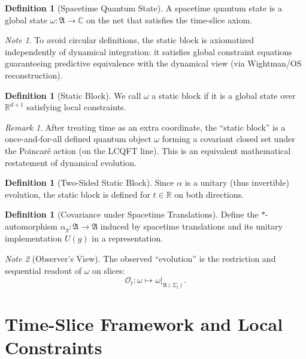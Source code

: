 \documentclass[11pt]{article}
\theoremstyle{definition}
\newtheorem{definition}[theorem]{Definition}
\theoremstyle{remark}
\newtheorem{remark}[theorem]{Remark}
\newtheorem*{note}{Note}
\begin{document}
\begin{definition}[Spacetime Quantum State]\label{def:spacetimestate}
A spacetime quantum state is a global state \( \omega: \mathfrak{A}\to\mathbb{C} \) on the net that satisfies the time-slice axiom.
\end{definition}

\begin{note}
To avoid circular definitions, the static block is axiomatized independently of dynamical integration: it satisfies global constraint equations guaranteeing predictive equivalence with the dynamical view (via Wightman/OS reconstruction).
\end{note}

\begin{definition}[Static Block]\label{def:staticblock}
We call \( \omega \) a static block if it is a global state over \( \mathbb{R}^{d+1} \) satisfying local constraints.
\end{definition}

\begin{remark}
After treating time as an extra coordinate, the ``static block'' is a once-and-for-all defined quantum object \( \omega \) forming a covariant closed set under the Poincaré action (on the LCQFT line). This is an equivalent mathematical restatement of dynamical evolution.
\end{remark}

\begin{definition}[Two-Sided Static Block]\label{def:twosided}
Since \( \alpha \) is a unitary (thus invertible) evolution, the static block is defined for \( t\in\mathbb{R} \) on both directions.
\end{definition}

\begin{definition}[Covariance under Spacetime Translations]\label{def:covariance}
Define the \( * \)-automorphism \( \alpha_g: \mathfrak{A}\to\mathfrak{A} \) induced by spacetime translations and its unitary implementation \( U(g) \) in a representation.
\end{definition}

\begin{note}[Observer's View]
The observed ``evolution'' is the restriction and sequential readout of \( \omega \) on slices:
\[
\mathcal{O}_t: \omega \mapsto \omega|_{\mathfrak{A}(\Sigma_t)}.
\]
\end{note}

\section{Time-Slice Framework and Local Constraints}\label{sec:timeslice}
\end{document}

